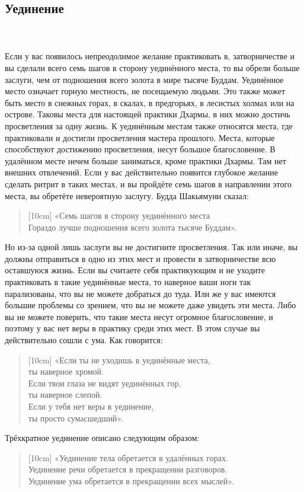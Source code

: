 \subsection{Уединение}
\\ \\ Если у вас появилось непреодолимое желание практиковать в, затворничестве и вы сделали всего семь шагов в сторону уединённого места, то вы обрели больше заслуги, чем от подношения всего золота в мире тысяче Буддам. Уединённое место означает горную местность, не посещаемую людьми. Это также может быть место в снежных горах, в скалах, в предгорьях, в лесистых холмах или на острове. Таковы места для настоящей практики Дхармы, в них можно достичь просветления за одну жизнь. К уединённым местам также относятся места, где практиковали и достигли просветления мастера прошлого. Места, которые способствуют достижению просветления, несут большое благословение. В удалённом месте нечем больше заниматься, кроме практики Дхармы. Там нет внешних отвлечений. Если у вас действительно появится глубокое желание сделать ритрит в таких местах, и вы пройдёте семь шагов в направлении этого места, вы обретёте невероятную заслугу. Будда Шакьямуни сказал:
\begin{verse}[10cm]
«Семь шагов в сторону уединённого места \\
Гораздо лучше подношения всего золота тысяче Буддам».\\
\end{verse}
Но из-за одной лишь заслуги вы не достигните просветления. Так или иначе, вы должны отправиться в одно из этих мест и провести в затворничестве всю оставшуюся жизнь. Если вы считаете себя практикующим и не уходите практиковать в такие уединённые места, то наверное ваши ноги так парализованы, что вы не можете добраться до туда. Или же у вас имеются большие проблемы со зрением, что вы не можете даже увидеть эти места. Либо вы не можете поверить, что такие места несут огромное благословение, и поэтому у вас нет веры в практику среди этих мест. В этом случае вы действительно сошли с ума. Как говорится:
\begin{verse}[10cm]
«Если ты не уходишь в уединённые места, \\ \indent ты наверное хромой. \\
Если твои глаза не видят уединённых гор, \\ \indent ты наверное слепой. \\
Если у тебя нет веры в уединение, \\ \indent ты просто сумасшедший».
\end{verse}
Трёхкратное уединение описано следующим образом:
\begin{verse}[10cm]
«Уединение тела обретается в удалённых горах. \\
Уединение речи обретается в прекращении разговоров. \\
Уединение ума обретается в прекращении всех мыслей».
\end{verse}
